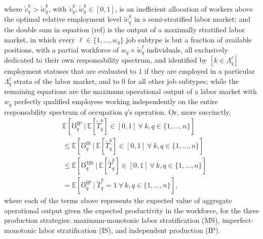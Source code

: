 \documentclass[hidelinks, nonatbib]{elsarticle}
\begin{document}
        where $\tilde{v}_{q}^{k} > \tilde{w}_{q}^{k}$, with $\tilde{v}_{q}^{k}, \tilde{w}_{q}^{k} \in [0,1]$, is an inefficient allocation of workers above the optimal relative employment level $\tilde{w}_{q}^{k}$ in a semi-stratified labor market; and the double sum in equation (ref) is the output of a maximally stratified labor market, in which every $\ell \in \{1, \dots, w_q\}$ job subtype is but a fraction of available positions, with a partial workforce of $w_q \times \tilde{w}_{q}^{\ell}$ individuals, all exclusively dedicated to their own responsability spectrum, and identified by $[k \in \Lambda_{q}^{\ell}]$ employment statuses that are evaluated to 1 if they are employed in a particular $\Lambda_{q}^{\ell}$ strata of the labor market, and to 0 for all other job subtypes; while the remaining equations are the maximum operational output of a labor market with $w_q$ perfectly qualified employees working independently on the entire responsability spectrum of occupation $q$'s operation. Or, more succinctly,
        \begin{align}
            &\mathbb{E}[
                \mho_{q}^{\text{IP}}
                \
                |
                \
                \mathbb{E}[
                    \tilde{T}_{q}^{k}
                ]
                \in [0,1]
                \
                \forall
                \
                k,q \in \{1, \dots, n\}
            ]
            \\
            &\leq
            \mathbb{E}[
                \mho_{q}^{\text{IS}}
                \
                |
                \
                \mathbb{E}[
                    \tilde{T}_{q}^{k}
                ]
                \in [0,1]
                \
                \forall
                \
                k,q \in \{1, \dots, n\}
            ]
            \\
            &\leq
            \mathbb{E}[
                \mho_{q}^{\text{MS}}
                \
                |
                \
                \mathbb{E}[
                    \tilde{T}_{q}^{k}
                ]
                \in [0,1]
                \
                \forall
                \
                k,q \in \{1, \dots, n\}
            ]
            \\
            &=
            \mathbb{E}[
                \mho_{q}^{\text{IP}}
                \
                |
                \
                \tilde{T}_{q}^{k}
                = 1
                \
                \forall
                \
                k,q \in \{1, \dots, n\}
            ]
            ,
        \end{align}
        where each of the terms above represents the expected value of aggregate operational output given the expected productivity in the workforce, for the three production strategies: maximum-monotonic labor stratification (MS), imperfect-monotonic labor stratification (IS), and independent production (IP).
\end{document}
